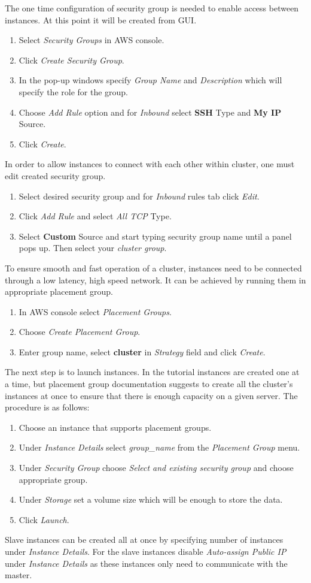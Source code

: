 \documentclass[12pt,english]{article}
\begin{document}
The one time configuration of security group is needed to enable access between instances. At this point it will be created from GUI.
\begin{enumerate}
	\item Select \textit{Security Groups} in AWS console.
	\item Click \textit{Create Security Group}.
	\item In the pop-up windows specify \textit{Group Name} and \textit{Description} which will specify the role for the group.
	\item Choose \textit{Add Rule} option and for \textit{Inbound} select \textbf{SSH} Type and \textbf{My IP} Source.
	\item Click \textit{Create}.
\end{enumerate}
In order to allow instances to connect with each other within cluster, one must edit created security group.
\begin{enumerate}
	\item Select desired security group and for \textit{Inbound} rules tab click \textit{Edit}.
	\item Click \textit{Add Rule} and select \textit{All TCP} Type.
	\item Select \textbf{Custom} Source and start typing security group name until a panel pops up. Then select your \textit{cluster group}.
\end{enumerate}
To ensure smooth and fast operation of a cluster, instances need to be connected through a low latency, high speed network. It can be achieved by running them in appropriate placement group.
\begin{enumerate}
	\item In AWS console select \textit{Placement Groups}.
	\item Choose \textit{Create Placement Group}.
	\item Enter group name, select \textbf{cluster} in \textit{Strategy} field and click \textit{Create}.
\end{enumerate}
The next step is to launch instances. In the tutorial instances are created one at a time, but placement group documentation suggests to create all the cluster's instances at once to ensure that there is enough capacity on a given server. The procedure is as follows:
\begin{enumerate}
	\item Choose an instance that supports placement groups.
	\item Under \textit{Instance Details} select \textit{group\_name} from the \textit{Placement Group} menu.
	\item Under \textit{Security Group} choose \textit{Select and existing security group} and choose appropriate group.
	\item Under \textit{Storage} set a volume size which will be enough to store the data.
	\item Click \textit{Launch}.
\end{enumerate}
Slave instances can be created all at once by specifying number of instances under \textit{Instance Details}. For the slave instances disable \textit{Auto-assign Public IP} under \textit{Instance Details} as these instances only need to communicate with the master.
\end{document}
